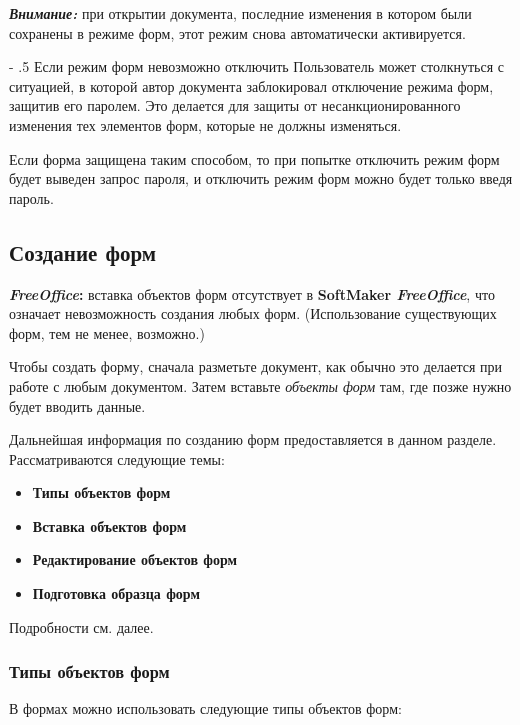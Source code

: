 ﻿\documentclass[a4paper,10pt]{article}
\makeatletter
\renewcommand\paragraph{%
   \@startsection{paragraph}{4}{0mm}%
      {-\baselineskip}%
      {.5\baselineskip}%
      {\normalfont\normalsize\bfseries}}
\makeatother
\begin{document}
\begin{mdframed}[backgroundcolor=blue!10]
\textbf{\textit{Внимание:}} при открытии документа, последние изменения в котором были сохранены в режиме форм, этот режим снова автоматически активируется.
\end{mdframed}

\paragraph{Если режим форм невозможно отключить}
Пользователь может столкнуться с ситуацией, в которой автор документа заблокировал отключение режима форм, защитив его паролем. Это делается для защиты от несанкционированного изменения тех элементов форм, которые не должны изменяться.

Если форма защищена таким способом, то при попытке отключить режим форм будет выведен запрос пароля, и отключить режим форм можно будет только введя пароль.

\subsection{Создание форм}
\begin{mdframed}[backgroundcolor=pink!50]
\textbf{\textit{FreeOffice}:} вставка объектов форм отсутствует в \textbf{SoftMaker \textit{FreeOffice}}, что означает невозможность создания любых форм. (Использование существующих форм, тем не менее, возможно.)
\end{mdframed}

Чтобы создать форму, сначала разметьте документ, как обычно это делается при работе с любым документом. Затем вставьте \textit{объекты форм} там, где позже нужно будет вводить данные.

Дальнейшая информация по созданию форм предоставляется в данном разделе. Рассматриваются следующие темы: 

\begin{itemize}
 \item \textbf{Типы объектов форм}
 \item \textbf{Вставка объектов форм}
 \item \textbf{Редактирование объектов форм}
 \item \textbf{Подготовка образца форм}
\end{itemize}

Подробности см. далее.

\subsubsection{Типы объектов форм}
В формах можно использовать следующие типы объектов форм:
\end{document}
